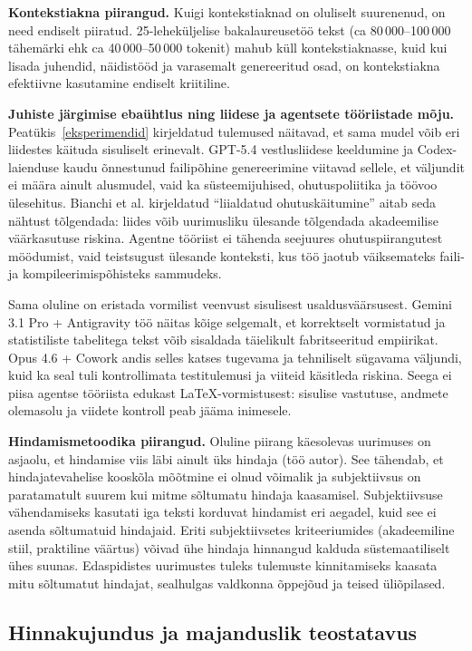 \textbf{Kontekstiakna piirangud.} Kuigi kontekstiaknad on oluliselt suurenenud, on need endiselt piiratud. 25-leheküljelise bakalaureusetöö tekst (ca 80\,000--100\,000 tähemärki ehk ca 40\,000--50\,000 tokenit) mahub küll kontekstiaknasse, kuid kui lisada juhendid, näidistööd ja varasemalt genereeritud osad, on kontekstiakna efektiivne kasutamine endiselt kriitiline.

\textbf{Juhiste järgimise ebaühtlus ning liidese ja agentsete tööriistade mõju.} Peatükis~\ref{eksperimendid} kirjeldatud tulemused näitavad, et sama mudel võib eri liidestes käituda sisuliselt erinevalt. GPT-5.4 vestlusliidese keeldumine ja Codex-laienduse kaudu õnnestunud failipõhine genereerimine viitavad sellele, et väljundit ei määra ainult alusmudel, vaid ka süsteemijuhised, ohutuspoliitika ja töövoo ülesehitus. Bianchi et al. \cite{bianchi2023safety} kirjeldatud ``liialdatud ohutuskäitumine'' aitab seda nähtust tõlgendada: liides võib uurimusliku ülesande tõlgendada akadeemilise väärkasutuse riskina. Agentne tööriist ei tähenda seejuures ohutuspiirangutest möödumist, vaid teistsugust ülesande konteksti, kus töö jaotub väiksemateks faili- ja kompileerimispõhisteks sammudeks.

Sama oluline on eristada vormilist veenvust sisulisest usaldusväärsusest. Gemini 3.1 Pro + Antigravity töö näitas kõige selgemalt, et korrektselt vormistatud ja statistiliste tabelitega tekst võib sisaldada täielikult fabritseeritud empiirikat. Opus 4.6 + Cowork andis selles katses tugevama ja tehniliselt sügavama väljundi, kuid ka seal tuli kontrollimata testitulemusi ja viiteid käsitleda riskina. Seega ei piisa agentse tööriista edukast \LaTeX{}-vormistusest: sisulise vastutuse, andmete olemasolu ja viidete kontroll peab jääma inimesele.

\textbf{Hindamismetoodika piirangud.} Oluline piirang käesolevas uurimuses on asjaolu, et hindamise viis läbi ainult üks hindaja (töö autor). See tähendab, et hindajatevahelise kooskõla mõõtmine ei olnud võimalik ja subjektiivsus on paratamatult suurem kui mitme sõltumatu hindaja kaasamisel. Subjektiivsuse vähendamiseks kasutati iga teksti korduvat hindamist eri aegadel, kuid see ei asenda sõltumatuid hindajaid. Eriti subjektiivsetes kriteeriumides (akadeemiline stiil, praktiline väärtus) võivad ühe hindaja hinnangud kalduda süstemaatiliselt ühes suunas. Edaspidistes uurimustes tuleks tulemuste kinnitamiseks kaasata mitu sõltumatut hindajat, sealhulgas valdkonna õppejõud ja teised üliõpilased.

\subsection{Hinnakujundus ja majanduslik teostatavus} \label{subsec:hinnakujundus}

